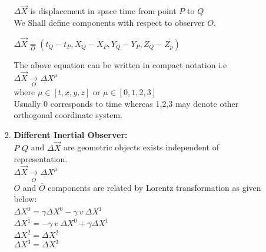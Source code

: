 \documentclass[11pt,a4paper]{article}
\begin{document}
\begin{enumerate}
\begin{enumerate}
\begin{enumerate}
\begin{figure}[H]
%
				                  \caption{} \label{Fig.2}
			                  \end{figure}
			                  $\Delta \vec{X}$ is displacement in space time from point $P$ to $Q$\\
			                  We Shall define components with respect to observer $O$.
			                  \begin{center}
				                  $\Delta \vec{X} \mathop = \limits^{\boldsymbol{\cdot}}_{O} \left(t_Q-t_P,X_Q-X_P,Y_Q-Y_P,Z_Q-Z_p\right)$\\
			                  \end{center}
			                  The above equation can be written in compact notation i.e\\
			                  $\Delta \vec{X} \mathop \rightarrow \limits^{}_{O} \Delta {X^{\mu}}$\\
			                  where $\mu \in \left[ t,x,y,z\right]$ or  $\mu \in \left[ 0,1,2,3\right]$\\
			                  Usually 0 corresponds to time whereas 1,2,3 may denote other orthogonal coordinate system.
			            \item \textbf{Different Inertial Observer:}\\
			                  $P$ $Q$ and $\Delta \vec{X}$ are geometric objects exists independent of representation.\\
			                  $\Delta \vec{X} \mathop \rightarrow \limits^{}_{\overline{O}} \Delta {X^{\overline{\mu}}}$\\
			                  $O$ and $\overline{O}$ components are related by Lorentz transformation as given below:\\
			                  $\Delta {X^{\overline{0}}}=\gamma {\Delta X^0} - \gamma\ v\ {\Delta X^1}$\\
			                  $\Delta {X^{\overline{1}}}=-\gamma\ v\ {\Delta X^0} + \gamma{\Delta X^1}$\\
			                  $\Delta {X^{\overline{2}}}={\Delta X^2}$\\
			                  $\Delta {X^{\overline{3}}}={\Delta X^3}$\\

\end{enumerate}
\end{enumerate}
\end{enumerate}
\end{document}
